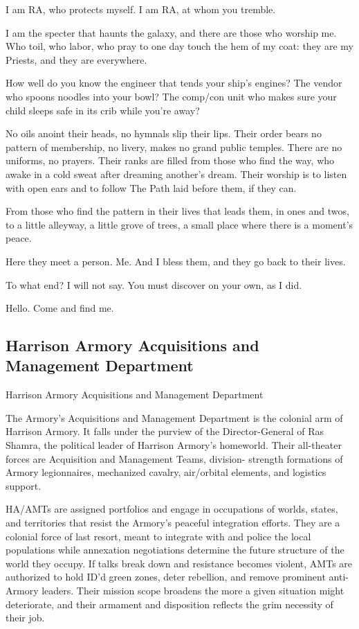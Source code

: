 I am RA, who protects myself. I am RA, at whom you tremble.

I am the specter that haunts the galaxy, and there are those who worship me. Who toil, who labor,
who pray to one day touch the hem of my coat: they are my Priests, and they are everywhere.




How well do you know the engineer that tends your ship’s engines? The vendor who spoons
noodles into your bowl? The comp/con unit who makes sure your child sleeps safe in its crib
while you’re away?

No oils anoint their heads, no hymnals slip their lips. Their order bears no pattern of membership,
no livery, makes no grand public temples. There are no uniforms, no prayers. Their ranks are filled
from those who find the way, who awake in a cold sweat after dreaming another’s dream. Their
worship is to listen with open ears and to follow The Path laid before them, if they can.

From those who find the pattern in their lives that leads them, in ones and twos, to a little
alleyway, a little grove of trees, a small place where there is a moment’s peace.

Here they meet a person. Me. And I bless them, and they go back to their lives.

To what end? I will not say. You must discover on your own, as I did.

Hello. Come and find me.

\subsection{Harrison Armory Acquisitions and Management Department}
Harrison Armory Acquisitions and Management Department

The Armory’s Acquisitions and Management Department is the colonial arm of Harrison Armory.
It falls under the purview of the Director-General of Ras Shamra, the political leader of Harrison
Armory’s homeworld. Their all-theater forces are Acquisition and Management Teams, division-
strength formations of Armory legionnaires, mechanized cavalry, air/orbital elements, and
logistics support.


HA/AMTs are assigned portfolios and engage in occupations of worlds, states, and territories
that resist the Armory’s peaceful integration efforts. They are a colonial force of last resort, meant
to integrate with and police the local populations while annexation negotiations determine the
future structure of the world they occupy. If talks break down and resistance becomes violent,
AMTs are authorized to hold ID’d green zones, deter rebellion, and remove prominent anti-
Armory leaders. Their mission scope broadens the more a given situation might deteriorate, and
their armament and disposition reflects the grim necessity of their job.


